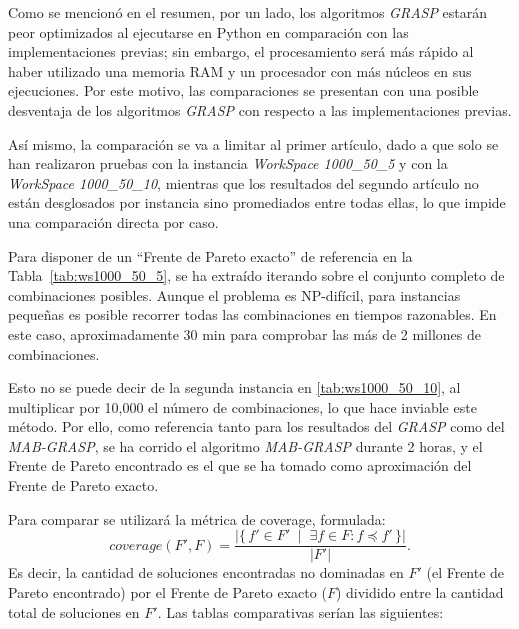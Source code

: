 \documentclass[12pt,a4paper]{book}
\begin{document}
Como se mencionó en el resumen, por un lado, los algoritmos \textit{GRASP} estarán peor optimizados al ejecutarse en 
Python en comparación con las implementaciones previas; sin embargo, el procesamiento será más rápido al haber utilizado una memoria RAM y un procesador con más núcleos en sus ejecuciones. Por este motivo, las comparaciones se presentan con una posible desventaja de los algoritmos \textit{GRASP} con respecto a las implementaciones previas.

Así mismo, la comparación se va a limitar al primer artículo, dado a que solo se han realizaron pruebas con la instancia \textit{WorkSpace 1000\_50\_5} y con la \textit{WorkSpace 1000\_50\_10}, mientras que los resultados del segundo artículo no están desglosados 
por instancia sino promediados entre todas ellas, lo que impide una comparación directa por caso.

Para disponer de un ``Frente de Pareto exacto'' de referencia en la Tabla~\ref{tab:ws1000_50_5}, se ha extraído iterando sobre el conjunto completo de combinaciones posibles.
Aunque el problema es NP-difícil, para instancias pequeñas es posible recorrer todas las combinaciones en tiempos razonables. En este caso, aproximadamente 30 min para comprobar las más de 2 millones de combinaciones. 

Esto no se puede decir de la segunda instancia en \ref{tab:ws1000_50_10}, al multiplicar por 10,000 el número de combinaciones, lo que hace inviable este método. Por ello, como referencia tanto para los resultados del \textit{GRASP} como del \textit{MAB-GRASP},
se ha corrido el algoritmo \textit{MAB-GRASP} durante 2 horas, y el Frente de Pareto encontrado es el que se ha tomado como aproximación del Frente de Pareto exacto.

Para comparar se utilizará la métrica de coverage, formulada:
$$coverage(F',F) = \frac{\left| \{\, f' \in F' \;\mid\; \exists f \in F : f \preceq f' \,\} \right|}{|F'|}.$$
Es decir, la cantidad de soluciones encontradas no dominadas en $F'$ (el Frente de Pareto encontrado) por el Frente de Pareto exacto ($F$) dividido entre la cantidad total de soluciones en $F'$.
Las tablas comparativas serían las siguientes:
\end{document}
